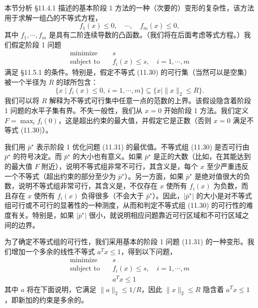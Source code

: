 \documentclass[UTF8,12pt,a4paper,fontset=fandol]{ctexart}
\begin{document}
本节分析 \S11.4.1 描述的基本阶段 1 方法的一种（次要的）变形的复杂性，该方法用于求解一组凸的不等式方程，
\begin{equation}
f_1(x)\leq 0,\quad \cdots,\quad f_m(x)\leq 0,
\tag{11.30}
\end{equation}
其中 $f_1,\cdots,f_m$ 是具有二阶连续导数的凸函数。（我们将在后面考虑等式方程。）我们假定阶段 1 问题
\begin{equation}
\begin{aligned}
\text{minimize}\quad & s\\
\text{subject to}\quad & f_i(x)\leq s,\quad i=1,\cdots,m
\end{aligned}
\tag{11.31}
\end{equation}
满足 \S11.5.1 的条件。特别是，假定不等式 (11.30) 的可行集（当然可以是空集）被一个半径为 $R$ 的球所包含：
\[
\{x\mid f_i(x)\leq 0,\ i=1,\cdots,m\}\subseteq \{x\mid \|x\|_2\leq R\}.
\]
我们可以将 $R$ 解释为不等式可行集中任意一点的范数的上界。该假设隐含着阶段 1 问题的水平子集有界。不失一般性，我们从 $x=0$ 开始阶段 1 方法。我们定义 $F=\max_i f_i(0)$，这是超出约束的最大值，并假定它是正数（否则 $x=0$ 满足不等式 (11.30)）。

我们用 $\bar{p}^\star$ 表示阶段 1 优化问题 (11.31) 的最优值。不等式组 (11.30) 是否可行由 $\bar{p}^\star$ 的符号决定。而 $\bar{p}^\star$ 的大小也有意义。如果 $\bar{p}^\star$ 是正的大数（比如，在其能达到的最大值 $F$ 附近），说明不等式组非常不可行，其含义是，每个 $x$ 至少严重违反一个不等式（超出约束的部分至少为 $\bar{p}^\star$）。另一方面，如果 $\bar{p}^\star$ 是绝对值很大的负数，说明不等式组非常可行，其含义是，不仅存在 $x$ 使所有 $f_i(x)$ 为负数，而且存在 $x$ 使所有 $f_i(x)$ 负得很多（不会大于 $\bar{p}^\star$）。因此，$|\bar{p}^\star|$ 的大小是对不等式组可行或不可行的显著性的一种测度，从而和判定不等式组 (11.30) 的可行性的难度有关。特别是，如果 $|\bar{p}^\star|$ 很小，就说明相应问题靠近可行区域和不可行区域之间的边界。

为了确定不等式组的可行性，我们采用基本的阶段 1 问题 (11.31) 的一种变形。我们增加一个多余的线性不等式 $a^Tx\leq 1$，得到以下问题，
\begin{equation}
\begin{aligned}
\text{minimize}\quad & s\\
\text{subject to}\quad & f_i(x)\leq s,\quad i=1,\cdots,m\\
& a^Tx\leq 1
\end{aligned}
\tag{11.32}
\end{equation}
其中 $a$ 将在下面说明，它满足 $\|a\|_2\leq 1/R$，因此 $\|x\|_2\leq R$ 隐含着 $a^Tx\leq 1$，即新加的约束是多余的。
\end{document}
